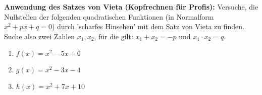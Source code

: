 \begin{aufgabenumgebung}
        \textbf{Anwendung des Satzes von Vieta (Kopfrechnen für Profis):}
        Versuche, die Nullstellen der folgenden quadratischen Funktionen (in Normalform $x^2+px+q=0$) durch 'scharfes Hinsehen' mit dem Satz von Vieta zu finden. Suche also zwei Zahlen $x_1, x_2$, für die gilt: $x_1+x_2 = -p$ und $x_1 \cdot x_2 = q$.
        \begin{enumerate}[label=(\alph*)]
            \item $f(x) = x^2 - 5x + 6$
            \item $g(x) = x^2 - 3x - 4$
            \item $h(x) = x^2 + 7x + 10$
        \end{enumerate}
\end{aufgabenumgebung}



